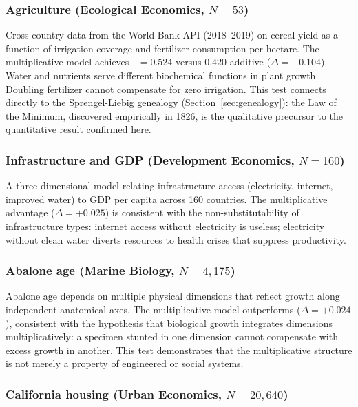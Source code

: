 \documentclass[12pt, a4paper]{article}
\theoremstyle{definition}
\theoremstyle{remark}
\DeclareMathOperator{\Spearman}{\rho_s}
\begin{document}
\subsubsection{Agriculture (Ecological Economics, $N = 53$)}

Cross-country data from the World Bank API (2018--2019) on cereal yield as a function of irrigation coverage and fertilizer consumption per hectare. The multiplicative model achieves $\Spearman = 0.524$ versus $0.420$ additive ($\Delta = +0.104$). Water and nutrients serve different biochemical functions in plant growth. Doubling fertilizer cannot compensate for zero irrigation. This test connects directly to the Sprengel-Liebig genealogy (Section~\ref{sec:genealogy}): the Law of the Minimum, discovered empirically in 1826, is the qualitative precursor to the quantitative result confirmed here.

\subsubsection{Infrastructure and GDP (Development Economics, $N = 160$)}

A three-dimensional model relating infrastructure access (electricity, internet, improved water) to GDP per capita across 160 countries. The multiplicative advantage ($\Delta = +0.025$) is consistent with the non-substitutability of infrastructure types: internet access without electricity is useless; electricity without clean water diverts resources to health crises that suppress productivity.

\subsubsection{Abalone age (Marine Biology, $N = 4{,}175$)}

Abalone age depends on multiple physical dimensions that reflect growth along independent anatomical axes. The multiplicative model outperforms ($\Delta = +0.024$), consistent with the hypothesis that biological growth integrates dimensions multiplicatively: a specimen stunted in one dimension cannot compensate with excess growth in another. This test demonstrates that the multiplicative structure is not merely a property of engineered or social systems.

\subsubsection{California housing (Urban Economics, $N = 20{,}640$)}
\end{document}
